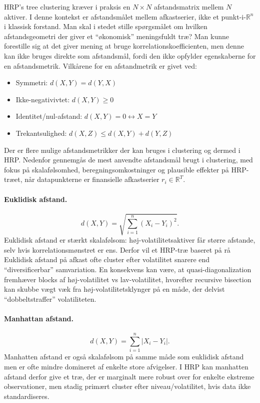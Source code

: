 \documentclass[../main.tex]{subfiles}
\begin{document}
HRP's tree clustering kræver i praksis en $N \times N$ afstandsmatrix mellem $N$ aktiver. I denne kontekst er afstandsmålet mellem afkastserier, ikke et punkt-i-$\mathbb{R}^n$ i klassisk forstand. Man skal i stedet stille spørgsmålet om hvilken afstandsgeometri der giver et ``økonomisk'' meningsfuldt træ? Man kunne forestille sig at det giver mening at bruge korrelationskoefficienten, men denne kan ikke bruges direkte som afstandsmål, fordi den ikke opfylder egenskaberne for en afstandsmetrik. Vilkårene for en afstandmetrik er givet ved:~\cite{lopez_de_prado_building_2016}
\begin{itemize}
    \item Symmetri: $d(X,Y)=d(Y,X)$
    \item Ikke-negativivtet: $d(X,Y)\geq 0$
    \item Identitet/nul-afstand: $d(X,Y)=0 \leftrightarrow X=Y$
    \item Trekantsulighed: $d(X,Z)\leq d(X,Y)+d(Y,Z)$
\end{itemize}

Der er flere mulige afstandsmetrikker der kan bruges i clustering og dermed i HRP. Nedenfor gennemgås de mest anvendte afstandsmål brugt i clustering, med fokus på skalafølsomhed, beregningsomkostninger og plausible effekter på HRP-træet, når datapunkterne er finansielle afkastserier $r_i \in \mathbb{R}^T$.

\paragraph{Euklidisk afstand.}
\[
    d(X,Y)=\sqrt{\sum_{i=1}^{n}(X_i-Y_i)^2}.
\]
Euklidisk afstand er stærkt skalafølsom: høj-volatilitetsaktiver får større afstande, selv hvis korrelationsmønstret er ens. Derfor vil et HRP-træ baseret på rå Euklidisk afstand på afkast ofte cluster efter volatilitet snarere end ``diversificerbar'' samvariation. En konsekvens kan være, at quasi-diagonalization fremhæver blocks af høj-volatilitet vs lav-volatilitet, hvorefter recursive bisection kan skubbe vægt væk fra høj-volatilitetsklynger på en måde, der delvist ``dobbeltstraffer'' volatiliteten.~\cite{nist_euclidean_distance_2017,kaae_karppinen_hierarchical_2022}

\paragraph{Manhattan afstand.}
\[
    d(X,Y)=\sum_{i=1}^{n}|X_i-Y_i|.
\]
Manhatten afstand er også skalafølsom på samme måde som euklidisk afstand men er ofte mindre domineret af enkelte store afvigelser. I HRP kan manhatten afstand derfor give et træ, der er marginalt mere robust over for enkelte ekstreme observationer, men stadig primært cluster efter niveau/volatilitet, hvis data ikke standardiseres.~\cite{nist_manhattan_distance_2017,kaae_karppinen_hierarchical_2022}
\end{document}
